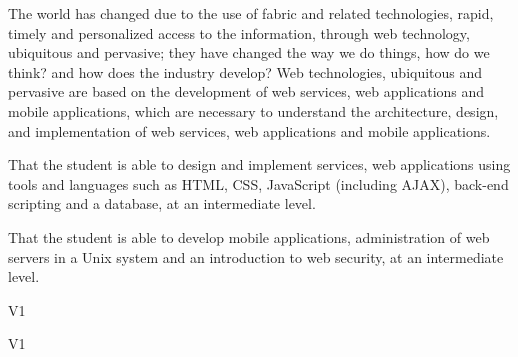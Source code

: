 \begin{syllabus}


\begin{justification}
The world has changed due to the use of fabric and related technologies, rapid, timely and personalized access to the
information, through web technology, ubiquitous and pervasive; they have changed the way we do things, how do we think? and how does the industry develop?
Web technologies, ubiquitous and pervasive are based on the development of web services, web applications and mobile applications,
which are necessary to understand the architecture, design, and implementation of web services, web applications and mobile applications.
\end{justification}

\begin{goals}
    \item That the student is able to design and implement services, web applications using tools and languages such as HTML, CSS, JavaScript (including AJAX), back-end scripting and a database, at an intermediate level.
    \item That the student is able to develop mobile applications, administration of web servers in a Unix system and an introduction to web security, at an intermediate level.
\end{goals}


\begin{outcomes}{V1}
    \item {}
    \item {}
    \item {}
    \item {}
    \item {}
\end{outcomes}

\begin{competences}{V1}
    \item {}
    \item {}
    \item {}
\end{competences}



\end{syllabus}
